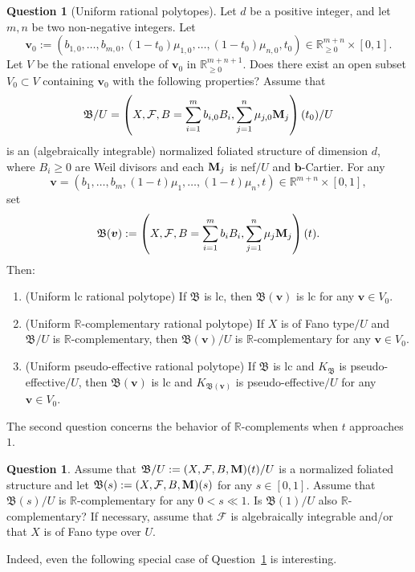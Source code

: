 \documentclass[11pt,reqno]{amsart}
\numberwithin{equation}{section}
\newcommand{\bb}{\bm{b}}
\newcommand{\Mm}{{\bf{M}}}
\newcommand{\Bb}{{\mathfrak{B}}}
\newcommand{\Ff}{\mathcal{F}}
\theoremstyle{definition}
\newtheorem{ques}[thm]{Question}
\begin{document}
\begin{ques}[Uniform rational polytopes]
    Let $d$ be a positive integer, and let $m,n$ be two non-negative integers. Let
    $$\bm{v}_0:=(b_{1,0},\dots,b_{m,0},(1-t_0)\mu_{1,0},\dots,(1-t_0)\mu_{n,0},t_0)\in\mathbb R_{\geq 0}^{m+n}\times [0,1].$$
    Let $V$ be the rational envelope of $\bm{v}_0$ in $\mathbb R_{\geq 0}^{m+n+1}$. Does there exist an open subset $V_0\subset V$ containing $\bm{v}_0$ with the following properties? Assume that $$\Bb/U=\left(X,\Ff,B=\sum_{i=1}^mb_{i,0}B_i,\sum_{j=1}^n\mu_{j,0}\Mm_j\right)(t_0)/U$$
    is an (algebraically integrable) normalized foliated structure of dimension $d$, where $B_i\geq 0$ are Weil divisors and each $\Mm_j$ is nef$/U$ and $\bb$-Cartier. For any 
    $$\bm{v}=(b_1,\dots,b_m,(1-t)\mu_1,\dots,(1-t)\mu_n,t)\in\mathbb R^{m+n}\times [0,1],$$
    set
$$\Bb(\bm{v}):=\left(X,\Ff,B=\sum_{i=1}^mb_iB_i,\sum_{j=1}^n\mu_j\Mm_j\right)(t).$$
    Then:
    \begin{enumerate}
        \item[(1)] (Uniform lc rational polytope) If $\Bb$ is lc, then $\Bb(\bm{v})$ is lc for any $\bm{v}\in V_0$.
        \item[(2)] (Uniform $\mathbb R$-complementary rational polytope) If $X$ is of Fano type$/U$ and $\Bb/U$ is $\mathbb R$-complementary, then $\Bb(\bm{v})/U$ is $\mathbb R$-complementary for any $\bm{v}\in V_0$.
        \item[(3)] (Uniform pseudo-effective rational polytope) If $\Bb$ is lc and $K_{\Bb}$ is pseudo-effective$/U$, then $\Bb(\bm{v})$ is lc and $K_{\Bb(\bm{v})}$ is pseudo-effective$/U$ for any $\bm{v}\in V_0$.
    \end{enumerate}
\end{ques}

The second question concerns the behavior of $\mathbb R$-complements when $t$ approaches $1$. 

\begin{ques}\label{ques: rcomplement when t=1}
Assume that $\Bb/U:=(X,\Ff,B,\Mm)(t)/U$ is a normalized foliated structure and let $\Bb(s):=(X,\Ff,B,\Mm)(s)$ for any $s\in [0,1]$. Assume that $\Bb(s)/U$ is $\mathbb R$-complementary for any $0<s\ll 1$. Is $\Bb(1)/U$ also $\mathbb R$-complementary? If necessary, assume that $\Ff$ is algebraically integrable and/or that $X$ is of Fano type over $U$.
\end{ques}

Indeed, even the following special case of Question~\ref{ques: rcomplement when t=1} is interesting.
\end{document}
